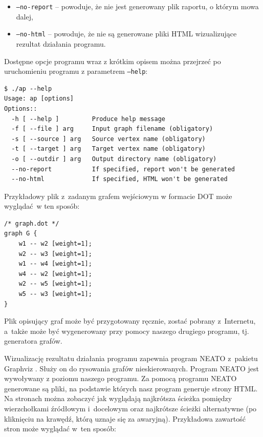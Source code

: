 \documentclass[a4paper, 12pt]{article}
\begin{document}
\begin{itemize}
\item \texttt{--no-report} -- powoduje, że nie jest generowany plik raportu, o którym mowa dalej,
\item \texttt{--no-html} -- powoduje, że nie są generowane pliki HTML wizualizujące rezultat działania programu.
\end{itemize}

Dostępne opcje programu wraz z krótkim opisem można przejrzeć po uruchomieniu programu z parametrem \texttt{--help}:

\begin{verbatim}
$ ./ap --help
Usage: ap [options]
Options::
  -h [ --help ]         Produce help message
  -f [ --file ] arg     Input graph filename (obligatory)
  -s [ --source ] arg   Source vertex name (obligatory)
  -t [ --target ] arg   Target vertex name (obligatory)
  -o [ --outdir ] arg   Output directory name (obligatory)
  --no-report           If specified, report won't be generated
  --no-html             If specified, HTML won't be generated
\end{verbatim}

Przykładowy plik z~zadanym grafem wejściowym w formacie DOT może wyglądać~w ten sposób:

\begin{verbatim}
/* graph.dot */
graph G {
	w1 -- w2 [weight=1];
	w2 -- w3 [weight=1];
	w1 -- w4 [weight=1];
	w4 -- w2 [weight=1];
	w2 -- w5 [weight=1];
	w5 -- w3 [weight=1];
}
\end{verbatim}

Plik opisujący graf może być przygotowany ręcznie, zostać pobrany z~Internetu, a~także może być wygenerowany przy pomocy naszego drugiego programu, tj. generatora grafów.

Wizualizację rezultatu działania programu zapewnia program NEATO z~pakietu Graphviz \cite{gv}. Służy on do rysowania grafów nieskierowanych. Program NEATO jest wywoływany z poziomu naszego programu. Za pomocą programu NEATO generowane są pliki, na podstawie których nasz program generuje strony HTML. Na stronach można zobaczyć jak wyglądają najkrótsza ścieżka pomiędzy wierzchołkami źródłowym i~docelowym oraz najkrótsze ścieżki alternatywne (po kliknięciu na krawędź, którą uznaje się za awaryjną). Przykładowa zawartość stron może wyglądać w~ten sposób:
\end{document}
